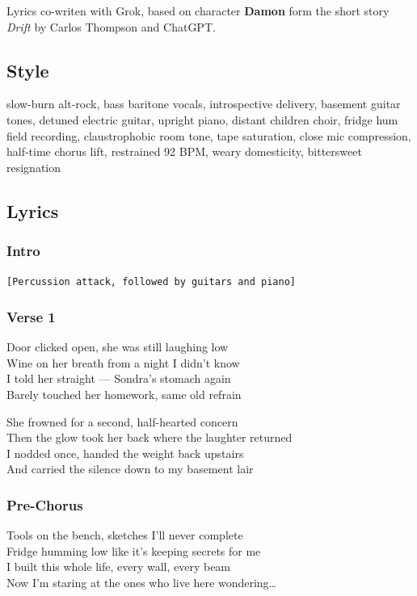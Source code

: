 Lyrics co-writen with Grok, based on character \textbf{Damon} form the
short story \emph{Drift} by Carlos Thompson and ChatGPT.

\subsection{Style}\label{style-37}

slow-burn alt-rock, bass baritone vocals, introspective delivery,
basement guitar tones, detuned electric guitar, upright piano, distant
children choir, fridge hum field recording, claustrophobic room tone,
tape saturation, close mic compression, half-time chorus lift,
restrained 92 BPM, weary domesticity, bittersweet resignation

\subsection{Lyrics}\label{lyrics-37}

\subsubsection{Intro}\label{intro-2}

\texttt{{[}Percussion\ attack,\ followed\ by\ guitars\ and\ piano{]}}

\subsubsection{Verse 1}\label{verse-1-26}

Door clicked open, she was still laughing low\\
Wine on her breath from a night I didn't know\\
I told her straight --- Sondra's stomach again\\
Barely touched her homework, same old refrain

She frowned for a second, half-hearted concern\\
Then the glow took her back where the laughter returned\\
I nodded once, handed the weight back upstairs\\
And carried the silence down to my basement lair

\subsubsection{Pre-Chorus}\label{pre-chorus-63}

Tools on the bench, sketches I'll never complete\\
Fridge humming low like it's keeping secrets for me\\
I built this whole life, every wall, every beam\\
Now I'm staring at the ones who live here wondering\ldots{}

